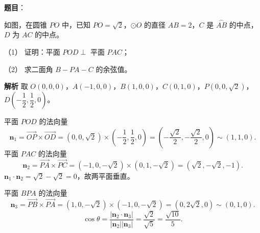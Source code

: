\begin{answer}

\textbf{题目}：

如图，在圆锥 $PO$ 中，已知 $PO=\sqrt2$，$\odot O$ 的直径 $AB=2$，$C$ 是 $\overset{\frown}{AB}$ 的中点，$D$ 为 $AC$ 的中点。

（1） 证明：平面 $POD\perp$ 平面 $PAC$；

（2） 求二面角 $B-PA-C$ 的余弦值。
\nopagebreak[4]
\begin{center}\end{center}
\nopagebreak[4]
\textbf{解析}
取 $O(0,0,0)$，$A(-1,0,0)$，$B(1,0,0)$，$C(0,1,0)$，$P(0,0,\sqrt2)$，$D\left(-\dfrac12,\dfrac12,0\right)$。

平面 $POD$ 的法向量
\nopagebreak[4]
\[\boldsymbol n_1=\overrightarrow{OP}\times\overrightarrow{OD}=(0,0,\sqrt2)\times\left(-\frac12,\frac12,0\right)=\left(-\frac{\sqrt2}2,-\frac{\sqrt2}2,0\right)\sim(1,1,0).\]
平面 $PAC$ 的法向量
\nopagebreak[4]
\[\boldsymbol n_2=\overrightarrow{PA}\times\overrightarrow{PC}=(-1,0,-\sqrt2)\times(0,1,-\sqrt2)=(\sqrt2,-\sqrt2,-1).\]
$\boldsymbol n_1\cdot\boldsymbol n_2=\sqrt2-\sqrt2=0$，故两平面垂直。

平面 $BPA$ 的法向量
\nopagebreak[4]
\[\boldsymbol n_3=\overrightarrow{PB}\times\overrightarrow{PA}=(1,0,-\sqrt2)\times(-1,0,-\sqrt2)=(0,2\sqrt2,0)\sim(0,1,0).\]
\nopagebreak[4]
\[\cos\theta=\frac{|\boldsymbol n_2\cdot\boldsymbol n_3|}{|\boldsymbol n_2||\boldsymbol n_3|}=\frac{\sqrt2}{\sqrt5}=\frac{\sqrt{10}}5.\]



\end{answer}
